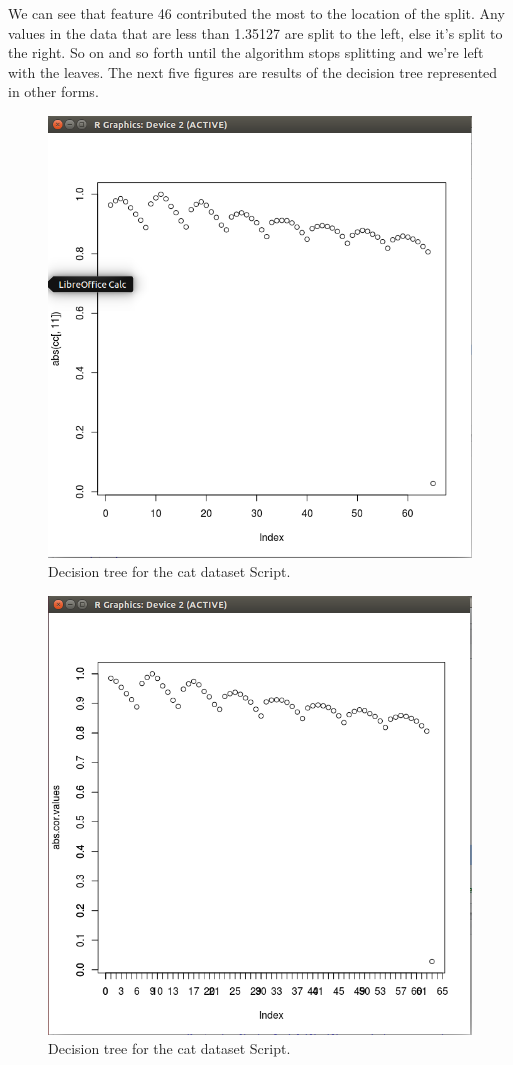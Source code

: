 \documentclass[12pt, letterpaper]{article}
\begin{document}
We can see that feature 46 contributed the most to the location of the split. Any values in the data that are less than 1.35127 are split to the left, else it's split to the right. So on and so forth until the algorithm stops splitting and we're left with the leaves. The next five figures are results of the decision tree represented in other forms.

\begin{figure}[H]
\centering
\includegraphics[width=5.0in]{catplot1}
\caption{Decision tree for the cat dataset Script.}
\label{fig:dtcd}
\end{figure}

\begin{figure}[H]
\centering
\includegraphics[width=5.0in]{catplot2}
\caption{Decision tree for the cat dataset Script.}
\label{fig:dtcd}
\end{figure}
\end{document}
